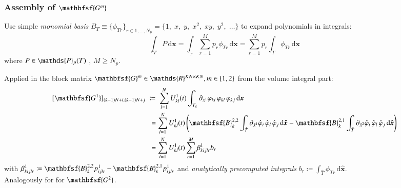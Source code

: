 \documentclass[final,12pt]{beamer}
\newcommand{\IP}{\ensuremath\mathds{P}}
\newcommand{\IR}{\ensuremath\mathds{R}}
\newcommand*{\vphi}{\varphi}                                     %
\renewcommand*{\vec}[1]{{\boldsymbol{#1}}}                       %
\newcommand*{\vecc}[1]{\mathbfsf{#1}}                            %
\newcommand*{\dd}{\mathrm{d}}                                    %
\begin{document}
\begin{frame}
  \frametitle{Assembly of $\vecc{G^m}$}
  Use simple \emph{monomial basis} \(B_T^{} \equiv \{\phi_{Tr}^{}\}_{r\in 1,\dots ,N_p} %
  = \{1,\;x,\;y,\;x^2,\;xy,\;y^2,\;\dots\}\)
  to expand polynomials in integrals:
  \begin{equation*}
    \int_{T}P\,\dd\vec{x} = \int_{_T}\sum_{r=1}^Mp_{r}^{}\phi_{Tr}^{}\,\dd\vec{x} = \sum_{r=1}^Mp_{r}^{}\int_T\phi_{Tr}^{}\,\dd\vec{x}
  \end{equation*}
  where \(P\in \IP_p(T)\)%
  , \(M\geq N_p\).
  \vspace*{\fill}

  \pause
  Applied in the block matrix \(\vecc{G}^m \in \IR^{KN\times KN}, m \in \{1,2\}\) from the volume
  integral part:
  \begin{equation*}
    \begin{split}
      [\vecc{G^1}]_{(k-1)N+i,(k-1)N+j} \;&\coloneqq\; \sum_{l=1}^NU_{kl}^1(t)\int_{T_k} \partial_{x^1}\vphi_{ki}\,\vphi_{kl}\,\vphi_{kj}\,\dd\vec{x}\\
      &\;= \sum_{l=1}^NU_{kl}^1(t)\left( \vecc{B}_k^{2,2}\int_{\hat T}\partial_{\hat x^1}\hat \vphi_i\,\hat \vphi_l\,\hat \vphi_j\,\dd\vec{\hat x} - \vecc{B}_k^{2,1}\int_{\hat T}\partial_{\hat x^2}\hat \vphi_i\,\hat \vphi_l\,\hat \vphi_j\,\dd\vec{\hat x} \right)\\
      &\;= \sum_{l=1}^NU_{kl}^1(t)\sum_{r=1}^M \beta_{kijlr}^1 b_r
    \end{split}
  \end{equation*}
  with \(\beta_{kijlr}^1 \coloneqq \vecc{B}_k^{2,2}p_{ijlr}^1 - \vecc{B}_k^{2,1}p_{ijlr}^1\)\;
  and \emph{analytically precomputed integrals}
  \(b_r \coloneqq \int_{\hat{T}}\phi_{\hat{T}r}^{}\,\dd\vec{\hat{x}} \).\\
  Analogously for  for \(\vecc{G^2}\).
\end{frame}
\end{document}
